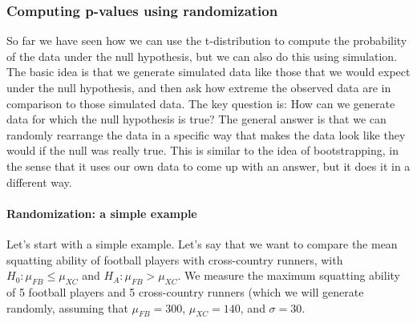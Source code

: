 \documentclass[]{book}
\let\oldparagraph\paragraph
\renewcommand{\paragraph}[1]{\oldparagraph{#1}\mbox{}}
\theoremstyle{definition}
\theoremstyle{definition}
\theoremstyle{definition}
\theoremstyle{remark}
\begin{document}
\subsubsection{Computing p-values using
randomization}\label{computing-p-values-using-randomization}

So far we have seen how we can use the t-distribution to compute the
probability of the data under the null hypothesis, but we can also do
this using simulation. The basic idea is that we generate simulated data
like those that we would expect under the null hypothesis, and then ask
how extreme the observed data are in comparison to those simulated data.
The key question is: How can we generate data for which the null
hypothesis is true? The general answer is that we can randomly rearrange
the data in a specific way that makes the data look like they would if
the null was really true. This is similar to the idea of bootstrapping,
in the sense that it uses our own data to come up with an answer, but it
does it in a different way.

\paragraph{Randomization: a simple
example}\label{randomization-a-simple-example}

Let's start with a simple example. Let's say that we want to compare the
mean squatting ability of football players with cross-country runners,
with \(H_0: \mu_{FB} \le \mu_{XC}\) and \(H_A: \mu_{FB} > \mu_{XC}\). We
measure the maximum squatting ability of 5 football players and 5
cross-country runners (which we will generate randomly, assuming that
\(\mu_{FB} = 300\), \(\mu_{XC} = 140\), and \(\sigma = 30\).
\end{document}
